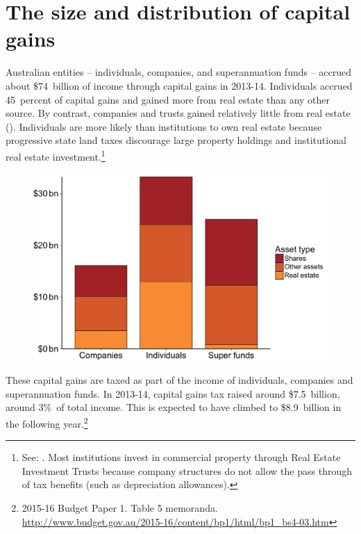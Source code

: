 \documentclass{grattanAlpha}\usepackage[]{graphicx}\usepackage[]{color}
\begin{document}
\section{The size and distribution of capital gains}




Australian entities -- individuals, companies, and superannuation funds -- accrued about \$74~billion of income through capital gains in 2013-14. Individuals accrued 45~percent
of capital gains and gained more from real estate than any other source. By contrast, companies and trusts gained relatively little from real estate (). Individuals are more likely than institutions to own real estate because progressive state land taxes discourage large property holdings and institutional real estate investment.\footnote{See: \textcite{DaleyCoates2015PropertyTaxes}. Most institutions invest in commercial property through Real Estate Investment Trusts because company structures do not allow the pass through of tax benefits (such as depreciation allowances).}


\begin{figure}[htbp]
\label{fig:CGT-by-entity-asset}
\includegraphics[width=\columnwidth]{CGT-NG-atlas//CGT-by-entity-asset-1}

\end{figure}

These capital gains are taxed as part of the income of individuals, companies and superannuation funds. In 2013-14, capital gains tax raised around \$7.5~billion, around 3\%\ of total income. This is expected to have climbed to \$8.9~billion in the following year.\footnote{2015-16 Budget Paper 1. Table 5 memoranda. \url{http://www.budget.gov.au/2015-16/content/bp1/html/bp1_bs4-03.htm}}
\end{document}
